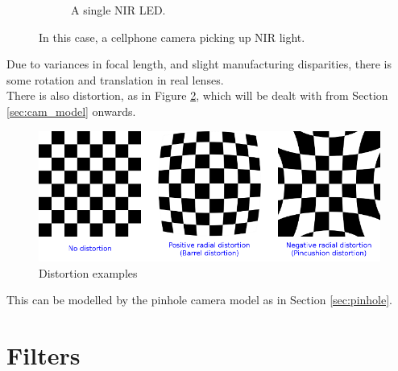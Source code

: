\begin{figure}[H]
\begin{subfigure}{0.5\textwidth}
\caption{A single NIR LED.}
\end{subfigure}
\caption{In this case, a cellphone camera picking up NIR light.}
\label{fig:ir_escape}
\end{figure}

Due to variances in focal length, and slight manufacturing disparities, there is some rotation and translation in real lenses.\\

There is also distortion, as in Figure \ref{fig:distortion_examples}, which will be dealt with from Section \ref{sec:cam_model} onwards.

\begin{figure}[H]
\centering
\includegraphics[scale=0.5]{images/distortion_examples.png}
\caption{Distortion examples \cite{calib3d}}
\label{fig:distortion_examples}
\end{figure}

This can be modelled by the pinhole camera model as in Section \ref{sec:pinhole}.

%
%
%


\section{Filters}
\label{sec:filters}


